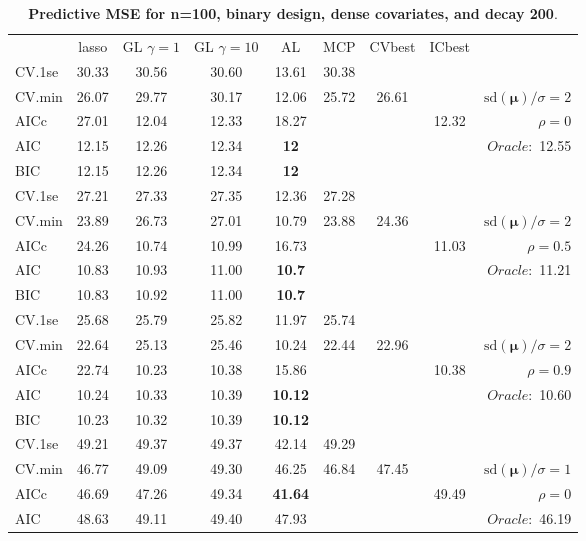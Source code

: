 \begin{table}\vspace{-.5cm}
\caption[l]{ { \bf Predictive MSE for n=100, binary design, 
dense covariates, and  decay  200}.}
\vspace{-.5cm}
\footnotesize{}
\begin{center}
\begin{tabular}{l*{7}{c}|r}
 & lasso & GL $\gamma=1$ & GL $\gamma=10$ & AL & MCP  & CVbest & ICbest  \\
\cline{1-9}
CV.1se & 30.33 & 30.56 & 30.60 & 13.61 & 30.38 & & & \\
CV.min & 26.07 & 29.77 & 30.17 & 12.06 & 25.72 & 26.61 & & $\mathrm{sd}(\mathbf{\mu})/\sigma=2$ \\
AICc & 27.01 & 12.04 & 12.33 & 18.27 & & & 12.32 &  $\rho=0$ \\
AIC & 12.15 & 12.26 & 12.34 & {\bf 12} & & & &  \multirow{2}{*}{$Oracle: $ 12.55} \\
BIC & 12.15 & 12.26 & 12.34 & {\bf 12} & & & &  \\
 \hline 
CV.1se & 27.21 & 27.33 & 27.35 & 12.36 & 27.28 & & & \\
CV.min & 23.89 & 26.73 & 27.01 & 10.79 & 23.88 & 24.36 & & $\mathrm{sd}(\mathbf{\mu})/\sigma=2$ \\
AICc & 24.26 & 10.74 & 10.99 & 16.73 & & & 11.03 &  $\rho=0.5$ \\
AIC & 10.83 & 10.93 & 11.00 & {\bf 10.7} & & & &  \multirow{2}{*}{$Oracle: $ 11.21} \\
BIC & 10.83 & 10.92 & 11.00 & {\bf 10.7} & & & &  \\
 \hline 
CV.1se & 25.68 & 25.79 & 25.82 & 11.97 & 25.74 & & & \\
CV.min & 22.64 & 25.13 & 25.46 & 10.24 & 22.44 & 22.96 & & $\mathrm{sd}(\mathbf{\mu})/\sigma=2$ \\
AICc & 22.74 & 10.23 & 10.38 & 15.86 & & & 10.38 &  $\rho=0.9$ \\
AIC & 10.24 & 10.33 & 10.39 & {\bf 10.12} & & & &  \multirow{2}{*}{$Oracle: $ 10.60} \\
BIC & 10.23 & 10.32 & 10.39 & {\bf 10.12} & & & &  \\
 \hline 
CV.1se & 49.21 & 49.37 & 49.37 & 42.14 & 49.29 & & & \\
CV.min & 46.77 & 49.09 & 49.30 & 46.25 & 46.84 & 47.45 & & $\mathrm{sd}(\mathbf{\mu})/\sigma=1$ \\
AICc & 46.69 & 47.26 & 49.34 & {\bf 41.64} & & & 49.49 &  $\rho=0$ \\
AIC & 48.63 & 49.11 & 49.40 & 47.93 & & & &  \multirow{2}{*}{$Oracle: $ 46.19} \\

\end{tabular}
\end{center}
\end{table}

